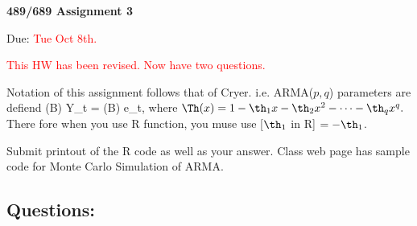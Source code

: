 

\begin{center} {\large \bf 489/689  Assignment 3}\\ \end{center}


{\large Due: \textcolor{red}{ Tue Oct 8th. }}


\textcolor{red}{ 
{\large This HW has been revised. Now have two questions. }
}


\noi Notation of this assignment follows that of Cryer. 
 i.e. ARMA($p,q$) parameters are defiend 
\ccc
\Phi(B) Y_t = \Th(B) e_t,
\ecc
where 
$\Th(x) = 1-\th_1x - \th_2 x^2 - \cdots - \th_q x^q.$
There fore when you use R function, you muse use 
[$\th_1$ in R] $ = - \th_1$.  

\noi Submit printout of the R code as well as your answer.  
Class web page has sample code for Monte Carlo Simulation of ARMA. 

\subsection*{Questions:}

